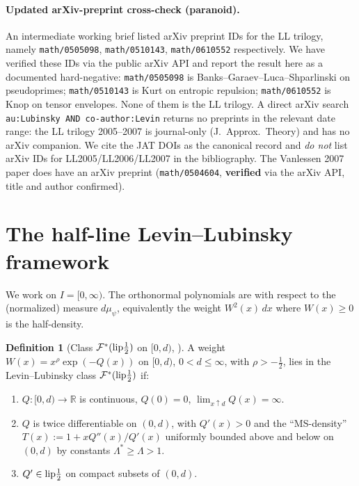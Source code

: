 \documentclass[11pt]{article}
\theoremstyle{definition}
\newtheorem{definition}[theorem]{Definition}
\newcommand{\R}{\mathbb{R}}
\begin{document}
\paragraph{Updated arXiv-preprint cross-check (paranoid).}  An
intermediate working brief listed arXiv preprint IDs for the LL
trilogy, namely \texttt{math/0505098}, \texttt{math/0510143},
\texttt{math/0610552} respectively.  We have verified these IDs via
the public arXiv API and report the result here as a documented
hard-negative: \texttt{math/0505098} is Banks--Garaev--Luca--Shparlinski
on pseudoprimes; \texttt{math/0510143} is Kurt on entropic repulsion;
\texttt{math/0610552} is Knop on tensor envelopes.  None of them is
the LL trilogy.  A direct arXiv search \texttt{au:Lubinsky AND
co-author:Levin} returns no preprints in the relevant date range:
the LL trilogy 2005--2007 is journal-only (J.\ Approx.\ Theory) and
has no arXiv companion.  We cite the JAT DOIs as the canonical record
and \emph{do not} list arXiv IDs for LL2005/LL2006/LL2007 in the
bibliography.  The Vanlessen 2007 paper does have an arXiv preprint
(\texttt{math/0504604}, \textbf{verified} via the arXiv API, title and
author confirmed).

\section{The half-line Levin--Lubinsky framework}\label{sec:LL}

We work on $I=[0,\infty)$.  The orthonormal polynomials are with
respect to the (normalized) measure $d\mu_\psi$, equivalently the
weight $W^2(x)\,dx$ where $W(x)\ge 0$ is the half-density.

\begin{definition}[Class $\mathcal{F}^*(\textnormal{lip}\frac{1}{2})$ on $[0,d)$,
{\cite[\S 1.2]{LL2005}}]\label{def:Fstar}
A weight $W(x)=x^\rho\exp(-Q(x))$ on $[0,d)$, $0<d\le\infty$, with
$\rho>-\frac{1}{2}$, lies in the Levin--Lubinsky class
$\mathcal{F}^*(\textnormal{lip}\frac{1}{2})$ if:
\begin{enumerate}[label=(F\arabic*),leftmargin=*]
\item $Q\colon[0,d)\to\R$ is continuous, $Q(0)=0$, $\lim_{x\uparrow d}Q(x)=\infty$.
\item $Q$ is twice differentiable on $(0,d)$, with $Q'(x)>0$ and the
   ``MS-density'' $T(x):=1+xQ''(x)/Q'(x)$ uniformly bounded above and below
   on $(0,d)$ by constants $\Lambda^*\ge\Lambda>1$.
\item $Q'\in\textnormal{lip}\frac{1}{2}$ on compact subsets of $(0,d)$.
\end{enumerate}
\end{definition}
\end{document}
